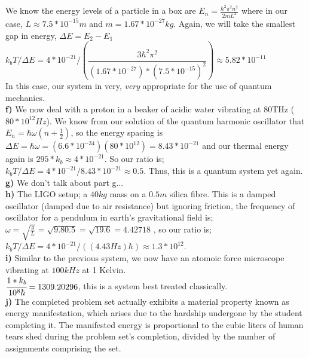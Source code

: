 \documentclass{journal}
\begin{document}
We know the energy levels of a particle in a box are $E_n=\frac{\hbar^2\pi^2n^2}{2mL^2}$ where in our case, $L\approx7.5*10^{-15}m$ and $m=1.67*10^{-27}kg$. Again, we will take the smallest gap in energy, $\Delta E=E_2-E_1$\\

$k_bT/\Delta E=4*10^{-21}/(\dfrac{3\hbar^2\pi^2}{(1.67*10^{-27})*(7.5*10^{-15})^2})\approx5.82*10^{-11}$\\

In this case, our system in very, \textit{very} appropriate for the use of quantum mechanics.\\

\textbf{f) } We now deal with a proton in a beaker of acidic water vibrating at 80THz ($80*10^{12}Hz$). We know from our solution of the quantum harmonic oscillator that $E_n=\hbar\omega(n+\frac12)$, so the energy spacing is $\Delta E=\hbar\omega=(6.6*10^{-34})(80*10^{12})=8.43*10^{-21}$ and our thermal energy again is $295*k_b\approx4*10^{-21}$. So our ratio is;\\


$k_bT/\Delta E=4*10^{-21}/8.43*10^{-21}\approx0.5$.  Thus, this is a quantum system yet again.\\
\textbf{g) } We don't talk about part g...\\
\textbf{h) } The LIGO setup; a $40kg$ mass on a $0.5m$ silica fibre. This is a damped oscillator (damped due to air resistance) but ignoring friction, the frequency of oscillator for a pendulum in earth's gravitational field is; $\omega=\sqrt{\frac{g}{L}}=\sqrt{{9.8}{0.5}}=\sqrt{19.6}=4.42718$
, so our ratio is; $k_bT/\Delta E=4*10^{-21}/((4.43Hz)\hbar)\approx1.3*10^{12}$.\\

\textbf{i) } Similar to the previous system, we now have an atomoic force microscope vibrating at $100kHz$ at 1 Kelvin.\\

$\cfrac{1*k_b}{10^{8}\hbar}=1309.20296$, this is a system best treated classically.\\

\textbf{j) } The completed problem set actually exhibits a  material property known as energy manifestation, which arises due to the hardship undergone by the student completing it. The manifested energy is proportional to the cubic liters of human tears shed during the problem set's completion, divided by the number of assignments comprising the set.\\
\end{document}
